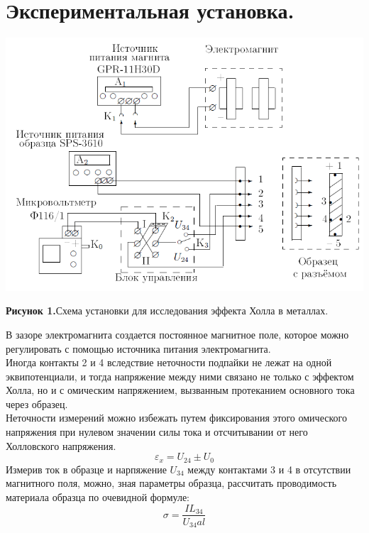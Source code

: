 \documentclass[a4paper, 12pt]{article}%
\begin{document}
\section*{Экспериментальная установка.}
\includegraphics[width = \textwidth]{5.png}\\
\begin{center}
\textbf{Рисунок 1.}Схема установки для исследования эффекта Холла в металлах.
\end{center}
В зазоре электромагнита создается постоянное магнитное поле, которое можно регулировать с помощью источника питания электромагнита.\\
Иногда контакты 2 и 4 вследствие неточности подпайки не лежат на одной эквипотенциали, и тогда напряжение между ними связано не только с эффектом Холла, но и с омическим напряжением, вызванным протеканием основного тока через образец. \\
Неточности измерений можно избежать путем фиксирования этого омического напряжения при нулевом значении силы тока и отсчитывании от него Холловского напряжения. 
\[\varepsilon_x = U_{24} \pm U_0\]
Измерив ток в образце и нарпяжение $U_{34}$ между контактами 3 и 4 в отсутствии магнитного поля, можно, зная параметры образца, рассчитать проводимость материала образца по очевидной формуле:
\begin{equation}
\sigma = \dfrac{I L_{34}}{U_{34}al}
\end{equation}
\end{document}
